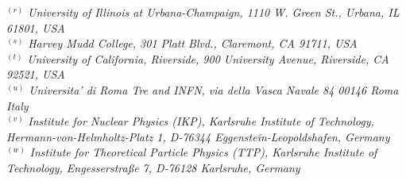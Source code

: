 {\begin{center}
$^{(r)}$ \emph{University of Illinois at Urbana-Champaign, 1110 W. Green St., Urbana, IL 61801, USA}\\
$^{(s)}$ \emph{Harvey Mudd College, 301 Platt Blvd., Claremont, CA 91711, USA}\\
$^{(t)}$ \emph{University of California, Riverside, 900 University Avenue, Riverside, CA 92521, USA}\\
$^{(u)}$ \emph{Universita' di Roma Tre and INFN, via della Vasca Navale 84 00146 Roma Italy}\\
$^{(v)}$ \emph{Institute for Nuclear Physics (IKP), Karlsruhe Institute of Technology, Hermann-von-Helmholtz-Platz 1, D-76344 Eggenstein-Leopoldshafen, Germany}\\
$^{(w)}$ \emph{Institute for Theoretical Particle Physics (TTP), Karlsruhe Institute of Technology, Engesserstra{\ss}e 7, D-76128 Karlsruhe, Germany}
\end{center}}


\vspace{0.25cm}

\\


